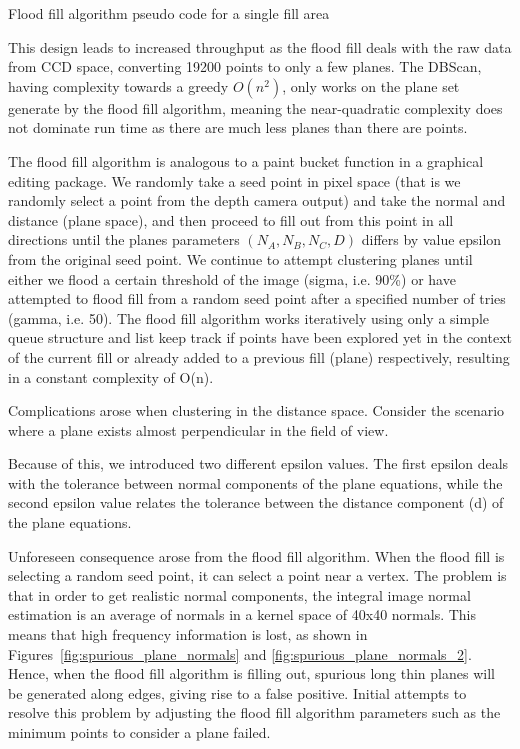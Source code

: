 \documentclass[]{article}
\begin{document}
{\begin{algorithm}[tbp]
{{{{				

			}
		}

		
		}
	}
	\bigskip
	\caption{Flood fill algorithm pseudo code for a single fill area}
	\label{alg:Flood fill algorithm pseudocode for a single fill area}
\end{algorithm}

This design leads to increased throughput as the flood fill deals with the raw data from CCD space, converting 19200 points to only a few planes. The DBScan, having complexity towards a greedy $O(n^{2})$, only works on the plane set generate by the flood fill algorithm, meaning the near-quadratic complexity does not dominate run time as there are much less planes than there are points. 

The flood fill algorithm is analogous to a paint bucket function in a graphical editing package. We randomly take a seed point in pixel space (that is we randomly select a point from the depth camera output) and take the normal and distance (plane space), and then proceed to fill out from this point in all directions until the planes parameters $(N_A, N_B, N_C, D)$ differs by value epsilon from the original seed point. We continue to attempt clustering planes until either we flood a certain threshold of the image (sigma, i.e. 90\%) or have attempted to flood fill from a random seed point after a specified number of tries (gamma, i.e. 50). The flood fill algorithm works iteratively using only a simple queue structure and list keep track if points have been explored yet in the context of the current fill or already added to a previous fill (plane) respectively, resulting in a constant complexity of O(n). 

Complications arose when clustering in the distance space. Consider the scenario where a plane exists almost perpendicular in the field of view. 

Because of this, we introduced two different epsilon values. The first epsilon deals with the tolerance between normal components of the plane equations, while the second epsilon value relates the tolerance between the distance component (d) of the plane equations. 

Unforeseen consequence arose from the flood fill algorithm. When the flood fill is selecting a random seed point, it can select a point near a vertex. The problem is that in order to get realistic normal components, the integral image normal estimation is an average of normals in a kernel space of 40x40 normals. This means that high frequency information is lost, as shown in Figures~\ref{fig:spurious_plane_normals} and \ref{fig:spurious_plane_normals_2}. Hence, when the flood fill algorithm is filling out, spurious long thin planes will be generated along edges, giving rise to a false positive. Initial attempts to resolve this problem by adjusting the flood fill algorithm parameters such as the minimum points to consider a plane failed.

}
\end{document}
